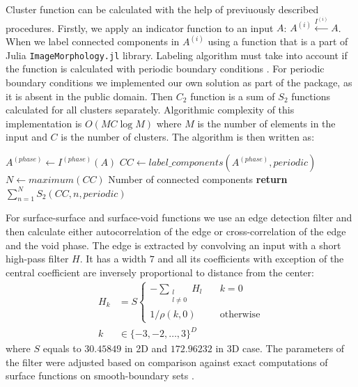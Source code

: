 \documentclass[1p]{elsarticle}
\newcommand{\code}[1]{\colorbox{light-gray}{\texttt{#1}}}
\begin{document}
Cluster function can be calculated with the help of previuously described
procedures.  Firstly, we apply an indicator function to an input $A$:
$A^{(i)} \xleftarrow{I^{(i)}} A$. When we label connected components in
$A^{(i)}$ using a function that is a part of Julia \code{ImageMorphology.jl}
library.  Labeling algorithm must take into account if the function is
calculated with periodic boundary conditions \cite{evstigneev2023}. For periodic
boundary conditions we implemented our own solution as part of the package, as
it is absent in the public domain. Then $C_2$ function is a sum of $S_2$
functions calculated for all clusters separately. Algorithmic complexity of this
implementation is $O(MC\log M)$ where $M$ is the number of elements in the input
and $C$ is the number of clusters. The algorithm is then written as:
\begin{algorithmic}[1]
  \State $A^{(phase)} \gets I^{(phase)} (A)$
  \State $CC \gets label\_components(A^{(phase)}, periodic)$
  \State $N \gets maximum(CC)$ \Comment Number of connected components
  \State \textbf{return} $\sum\limits_{n=1}^N S_2(CC, n, periodic)$
  \EndProcedure
\end{algorithmic}

For surface-surface and surface-void functions we use an edge detection filter
\cite{samarin2023robust} and then calculate either autocorrelation of the edge
or cross-correlation of the edge and the void phase. The edge is extracted by
convolving an input with a short high-pass filter $H$. It has a width $7$ and
all its coefficients with exception of the central coefficient are inversely
proportional to distance from the center:
\begin{equation}
  \begin{aligned}
    H_k &= S \left\{
    \begin{array}{ll}
      -\sum\limits_{\substack{l \\ l \ne 0}} H_l & \quad k = 0 \\
      1 / \rho(k, 0) & \quad \text{otherwise}
    \end{array}
    \right. \\
    k &\in \{-3, -2, \dots, 3\}^D
  \end{aligned}
  \label{eq:filter-7x7}
\end{equation}
where $S$ equals to $30.45849$ in 2D and $172.96232$ in 3D case. The parameters
of the filter were adjusted based on comparison against exact computations of
surface functions on smooth-boundary sets \cite{postcov23}.
\end{document}
